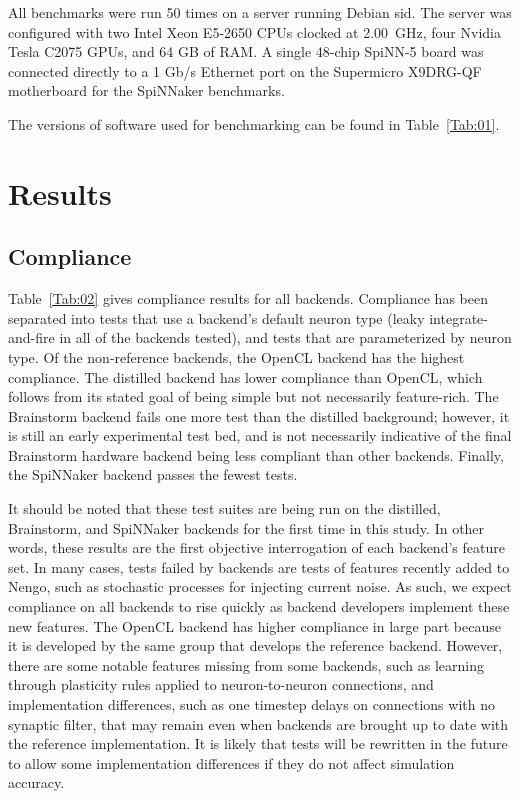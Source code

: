 \documentclass{frontiersSCNS}
\begin{document}
All benchmarks were run 50 times
on a server running Debian sid.
The server was configured with
two Intel Xeon E5-2650 CPUs
clocked at 2.00~GHz,
four Nvidia Tesla C2075 GPUs,
and 64 GB of RAM.
A single 48-chip SpiNN-5 board
was connected directly to
a 1 Gb/s Ethernet port on
the Supermicro X9DRG-QF motherboard
for the SpiNNaker benchmarks.

The versions of software
used for benchmarking can be found in
Table~\ref{Tab:01}.

\section{Results}

\subsection{Compliance}
Table~\ref{Tab:02} gives compliance results for all backends.
Compliance has been separated into tests
that use a backend's default neuron type
(leaky integrate-and-fire in all of the backends tested),
and tests that are parameterized by neuron type.
Of the non-reference backends,
the OpenCL backend has the highest compliance.
The distilled backend has lower compliance
than OpenCL, which follows from its stated goal
of being simple but not necessarily feature-rich.
The Brainstorm backend fails one more test
than the distilled background;
however, it is still an early experimental test bed,
and is not necessarily indicative of the
final Brainstorm hardware backend being
less compliant than other backends.
Finally, the SpiNNaker backend
passes the fewest tests.

It should be noted that these test suites
are being run on the distilled, Brainstorm,
and SpiNNaker backends for the first time in this study.
In other words, these results are the first objective
interrogation of each backend's feature set.
In many cases, tests failed by backends
are tests of features recently added
to Nengo, such as stochastic processes
for injecting current noise.
As such, we expect compliance on all backends
to rise quickly as backend developers
implement these new features.
The OpenCL backend has
higher compliance in large part
because it is developed by the same
group that develops the reference backend.
However, there are some notable features
missing from some backends,
such as learning through plasticity rules
applied to neuron-to-neuron connections,
and implementation differences,
such as one timestep delays on connections
with no synaptic filter,
that may remain even when backends
are brought up to date with
the reference implementation.
It is likely that tests will be rewritten
in the future to allow some implementation differences
if they do not affect simulation accuracy.
\end{document}

